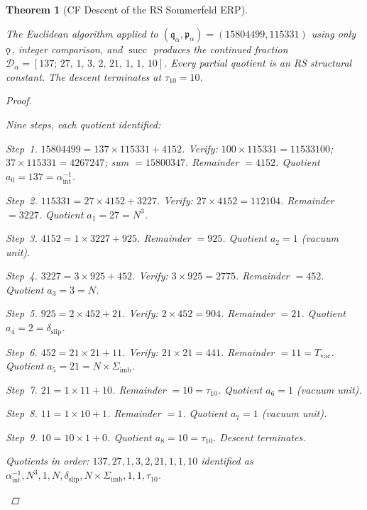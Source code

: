 \documentclass[11pt, letterpaper]{article}
\renewcommand{\succ}{\operatorname{succ}}
\newcommand{\koppa}{\mathbin{\text{\rm\k{o}}}}
\newcommand{\Sigimb}{\Sigma_{\mathrm{imb}}}
\newcommand{\dslip}{\delta_{\mathrm{slip}}}
\newcommand{\Tvac}{T_{\mathrm{vac}}}
\newcommand{\tauX}{\tau_{10}}
\newcommand{\aSC}{\alpha^{-1}_{\mathrm{int}}}
\newcommand{\pa}{\mathfrak{p}_\alpha}
\newcommand{\qa}{\mathfrak{q}_\alpha}
\newcommand{\Da}{\mathcal{D}_\alpha}
\theoremstyle{definition}
\theoremstyle{plain}
\newtheorem{theorem}{Theorem}[section]
\begin{document}
\begin{theorem}[CF Descent of the RS Sommerfeld ERP]
\label{thm:sommerfeld-descent}
\begin{rsbox}
The Euclidean algorithm applied to $(\qa,\pa)=(15804499,115331)$ using only
$\koppa$, integer comparison, and $\succ$ produces the continued fraction
$\Da=[137;\,27,\,1,\,3,\,2,\,21,\,1,\,1,\,10]$.  Every partial quotient is
an RS structural constant.  The descent terminates at $\tauX=10$.
\end{rsbox}
\begin{proof}
\begin{rsbox}
Nine steps, each quotient identified:

\textit{Step~1.}  $15804499=137\times115331+4152$.
Verify: $100\times115331=11533100$; $37\times115331=4267247$;
sum $=15800347$.  Remainder $=4152$.  Quotient $a_0=137=\aSC$.

\textit{Step~2.}  $115331=27\times4152+3227$.
Verify: $27\times4152=112104$.  Remainder $=3227$.  Quotient $a_1=27=N^3$.

\textit{Step~3.}  $4152=1\times3227+925$.
Remainder $=925$.  Quotient $a_2=1$ (vacuum unit).

\textit{Step~4.}  $3227=3\times925+452$.
Verify: $3\times925=2775$.  Remainder $=452$.  Quotient $a_3=3=N$.

\textit{Step~5.}  $925=2\times452+21$.
Verify: $2\times452=904$.  Remainder $=21$.  Quotient $a_4=2=\dslip$.

\textit{Step~6.}  $452=21\times21+11$.
Verify: $21\times21=441$.  Remainder $=11=\Tvac$.
Quotient $a_5=21=N\times\Sigimb$.

\textit{Step~7.}  $21=1\times11+10$.
Remainder $=10=\tauX$.  Quotient $a_6=1$ (vacuum unit).

\textit{Step~8.}  $11=1\times10+1$.
Remainder $=1$.  Quotient $a_7=1$ (vacuum unit).

\textit{Step~9.}  $10=10\times1+0$.
Quotient $a_8=10=\tauX$.  Descent terminates.

Quotients in order: $137,27,1,3,2,21,1,1,10$ identified as
$\aSC,N^3,1,N,\dslip,N\times\Sigimb,1,1,\tauX$.
\end{rsbox}
\end{proof}
\end{theorem}
\end{document}
